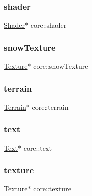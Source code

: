 \mbox{\label{namespacecore_adf2f7f5f951bd01b06d6c792d7bf301b}} 
\subsubsection{\texorpdfstring{shader}{shader}}
{\footnotesize\ttfamily \hyperlink{classshader_1_1Shader}{Shader}$\ast$ core\+::shader}

\mbox{\label{namespacecore_aa7075d07c89f570f428557cfaaefc16b}} 
\subsubsection{\texorpdfstring{snow\+Texture}{snowTexture}}
{\footnotesize\ttfamily \hyperlink{classtexture_1_1Texture}{Texture}$\ast$ core\+::snow\+Texture}

\mbox{\label{namespacecore_ac45da6f80dac9bead5c9310c27897f15}} 
\subsubsection{\texorpdfstring{terrain}{terrain}}
{\footnotesize\ttfamily \hyperlink{classterrain_1_1Terrain}{Terrain}$\ast$ core\+::terrain}

\mbox{\label{namespacecore_a7f65917b3299aa904f0516343ec522db}} 
\subsubsection{\texorpdfstring{text}{text}}
{\footnotesize\ttfamily \hyperlink{classfont_1_1Text}{Text}$\ast$ core\+::text}

\mbox{\label{namespacecore_ab1e87a88eb2e893aa68d0d791ac9859c}} 
\subsubsection{\texorpdfstring{texture}{texture}}
{\footnotesize\ttfamily \hyperlink{classtexture_1_1Texture}{Texture}$\ast$ core\+::texture}

